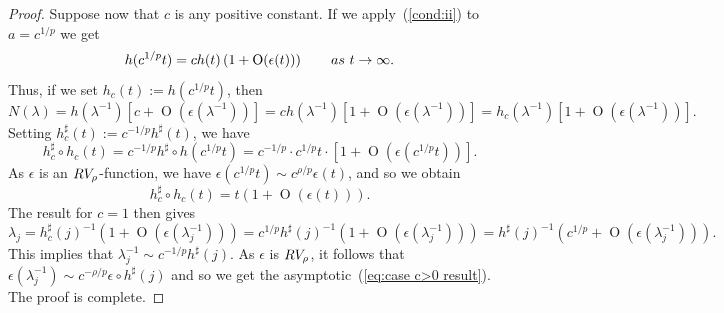 \documentclass[10pt,a4paper]{amsart}
\newcommand{\RV}{\textup{RV}}
\newcommand{\op}{\operatorname}
\begin{document}
\begin{proof}
Suppose now that $c$ is any positive constant. If we apply~(\ref{cond:ii}) to $a=c^{1/p}$ we get
\begin{equation*}
h(c^{1/p}t)=c h(t)\left(1+\op{O}(\epsilon(t))\right) \qquad \textup{as}\ t\rightarrow \infty.
\end{equation*}
Thus, if we set $h_c(t):=h(c^{1/p}t)$, then 
\begin{equation*}
N(\lambda)=h(\lambda^{-1}) \left[ c+\op{O}\left(\epsilon(\lambda^{-1})\right)\right]=ch(\lambda^{-1}) \left[ 1+\op{O}\left(\epsilon(\lambda^{-1})\right)\right]=h_c(\lambda^{-1}) \left[ 1+\op{O}\left(\epsilon(\lambda^{-1})\right)\right].
\end{equation*}
Setting $h_c^\sharp(t):=c^{-1/p}h^\sharp(t)$, we have
\begin{equation*}
h_c^\sharp\circ h_c(t)=c^{-1/p}h^\sharp \circ h(c^{1/p}t)=c^{-1/p}\cdot c^{1/p}t\cdot[1+\op{O}(\epsilon(c^{1/p}t))].
\end{equation*}
As $\epsilon$ is an $\RV_\rho$-function, we have $ \epsilon(c^{1/p}t)\sim c^{\rho/p}\epsilon(t)$, and so we obtain
\begin{equation*}
h_c^\sharp\circ h_c(t)=t(1+\op{O}(\epsilon(t))).
\end{equation*}
The result for $c=1$ then gives
\begin{equation*}
\lambda_j= h_c^\sharp(j)^{-1}(1+\op{O}(\epsilon(\lambda_j^{-1})))= c^{1/p}h^\sharp(j)^{-1}(1+\op{O}(\epsilon(\lambda_j^{-1})))=h^\sharp(j)^{-1}(c^{1/p}+\op{O}(\epsilon(\lambda_j^{-1}))).
\end{equation*}
This implies that $\lambda_j^{-1}\sim c^{-1/p}h^\sharp(j)$. As $\epsilon$ is $\RV_\rho$, it follows that $\epsilon(\lambda_j^{-1})\sim c^{-\rho/p}\epsilon \circ h^\sharp(j)$ and so we get the asymptotic~(\ref{eq:case c>0 result}). The proof is complete. 
\end{proof}
\end{document}

